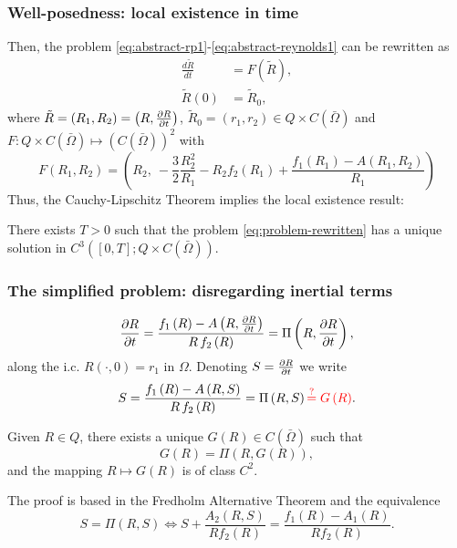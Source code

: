 \documentclass[10pt,aspectratio=169]{beamer}
\newcommand{\cont}{C\left(\bar{\Omega}\right)}
\begin{document}
\begin{frame}\frametitle{Well-posedness: local existence in time}
Then, the problem \eqref{eq:abstract-rp1}-\eqref{eq:abstract-reynolds1} can be rewritten as
\begin{equation}
\begin{split}
\frac{d\tilde{R}}{dt}&=F(\tilde{R}),\\
\tilde{R}(0)&=\tilde{R}_0,
\end{split}\label{eq:problem-rewritten}
\end{equation}
where $\tilde{R}=\left(R_1,R_2\right)=\left(R,\frac{\partial R}{\partial t}\right)$, $\tilde{R}_0=(r_1,r_2)\in Q\times \cont$ and $F:Q\times \cont\mapsto \left(\cont\right)^2$ with
\begin{equation}
F(R_1,R_2)=\left(
R_2,~-\frac{3}{2}\frac{R_2^2}{R_1}-R_2f_2\left(R_1\right)+\frac{f_1\left(R_1\right)-A\left(R_1,R_2\right)}{R_1}\right)
\end{equation}
Thus, the Cauchy-Lipschitz Theorem implies the local existence result:
\begin{theorem}There exists $T>0$ such that the  problem \eqref{eq:problem-rewritten} has a unique solution in $C^3\left([0,T];Q\times \cont\right)$.
\end{theorem}
\end{frame}

\begin{frame}
\frametitle{The simplified problem: disregarding inertial terms}
\vspace*{0.6cm}
\begin{equation}
\frac{\partial R}{\partial t}=\frac{f_1\left(R\right)-A\left(R,\frac{\partial R}{\partial t}\right)}{R\,f_2\left(R\right)}=\Pi\left(R,\frac{\partial R}{\partial t}\right)\label{eq:abstract-rp-inertialess},
\end{equation}
along the i.c. $R\left(\cdot,0\right)=r_1$ in $\Omega$.
Denoting $S=\frac{\partial R}{\partial t}$ we write
\begin{equation}
S=\frac{f_1\left(R\right)-A\left(R,S\right)}{R\,f_2\left(R\right)}=\Pi\left(R,S\right){\color{red}\overset{?}{=}G\left(R\right)}.
\end{equation}\vspace*{-0.5cm}
\begin{lemma}\label{lemma:fixed-point-Pi}
	Given $R\in Q$, there exists a unique $G\left(R\right)\in \cont$ such that
	$$G\left(R\right)=\Pi\left(R,G\left(R\right)\right),$$
	and the mapping $R\mapsto G\left(R\right)$ is of class $C^2$.
\end{lemma}
The proof is based in the Fredholm Alternative Theorem and the equivalence
$$S=\Pi\left(R,S\right)\Leftrightarrow S+\frac{A_2\left(R,S\right)}{Rf_2\left(R\right)}=\frac{f_1\left(R\right)-A_1\left(R\right)}{Rf_2\left(R\right)}.$$
\end{frame} 
\end{document}

